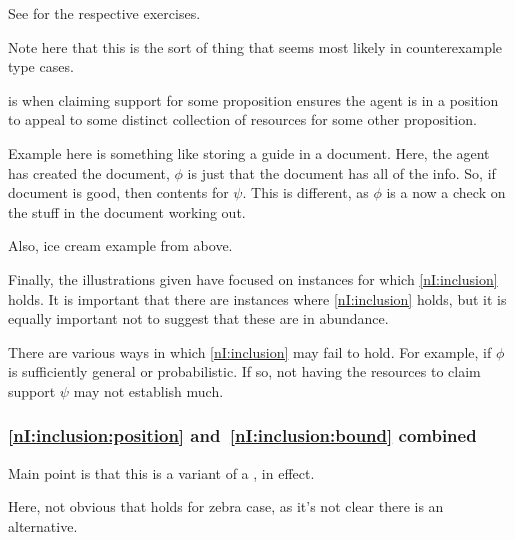 \begin{note}[Inclusion]
{    See \textcite[210]{Blackburn:2002aa} for the respective exercises.
  }

  {
    \color{red}
    Note here that this is the sort of thing that seems most likely in counterexample type cases.
  }
\end{note}

\begin{note}[\asso{}]
  \asso{} is when claiming support for some proposition ensures the agent is in a position to appeal to some distinct collection of resources for some other proposition.

  \begin{illustration}
    Example here is something like storing a guide in a document.
    Here, the agent has created the document, \(\phi\) is just that the document has all of the info.
    So, if document is good, then contents for \(\psi\).
    This is different, as \(\phi\) is a now a check on the stuff in the document working out.
  \end{illustration}

  Also, ice cream example from above.
\end{note}

\begin{note}
  Finally, the illustrations given have focused on instances for which \ref{nI:inclusion} holds.
  It is important that there are instances where \ref{nI:inclusion} holds, but it is equally important not to suggest that these are in abundance.
\end{note}

\begin{note}
  There are various ways in which \ref{nI:inclusion} may fail to hold.
  For example, if \(\phi\) is sufficiently general or probabilistic.
  If so, not having the resources to claim support \(\psi\) may not establish much.
\end{note}

\subsubsection{\ref{nI:inclusion:position} and~\ref{nI:inclusion:bound} combined}

\begin{note}
  {\color{red}
    Main point is that this is a variant of a \requ{}, in effect.
  }
\end{note}

\begin{note}
  Here, not obvious that holds for zebra case, as it's not clear there is an alternative.
\end{note}

